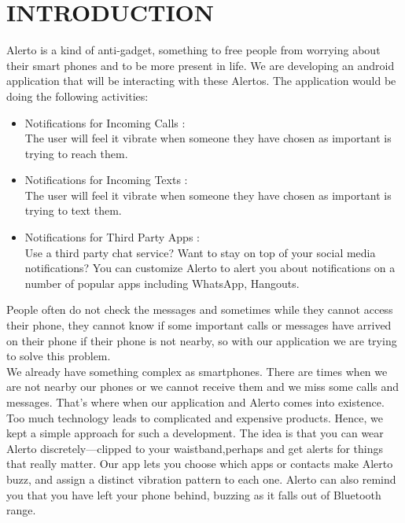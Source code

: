 \documentclass[12pt,a4paper]{report}
\begin{document}
\section{INTRODUCTION}
\hspace{0.7in}Alerto is a kind of anti-gadget, something to free people from worrying about their smart phones and to be more present in life. We are developing an android application that will be interacting with these Alertos. The application would be doing the following activities:
\begin{itemize}
	\item Notifications for Incoming Calls :\\
	\hspace{0.5in}	The user will feel it vibrate when someone they have
	chosen as important is trying to reach them.
	\item Notifications for Incoming Texts :\\
	\hspace{0.5in}	The user will feel it vibrate when someone they have chosen as important is trying to text them.
	\item Notifications for Third Party Apps :\\
	\hspace{0.5in}Use a third party chat service? Want to stay on top of your social media notifications? You can customize Alerto to alert you about notifications on a number of popular apps including WhatsApp, Hangouts.
\end{itemize}

\hspace{0.2 in}People often do not check the messages and sometimes while they cannot access their phone, they cannot know if  some important calls or messages have arrived on their phone if their phone is not nearby, so with our application we are trying to solve this problem. \\

\hspace{0.2 in}We already have something complex as smartphones. There are times when we are not nearby our phones or we cannot receive them and we miss some calls and messages. That’s where when our application and Alerto comes into existence. Too much technology leads to complicated and expensive products. Hence, we kept a simple approach for such a development. The idea is that you can wear Alerto discretely—clipped to your waistband,perhaps and get alerts for things that really matter. Our app lets you choose which apps or contacts make Alerto buzz, and assign a distinct vibration pattern to each one. Alerto can also remind you that you have left your phone behind, buzzing as it falls out of Bluetooth range.\\
\end{document}
